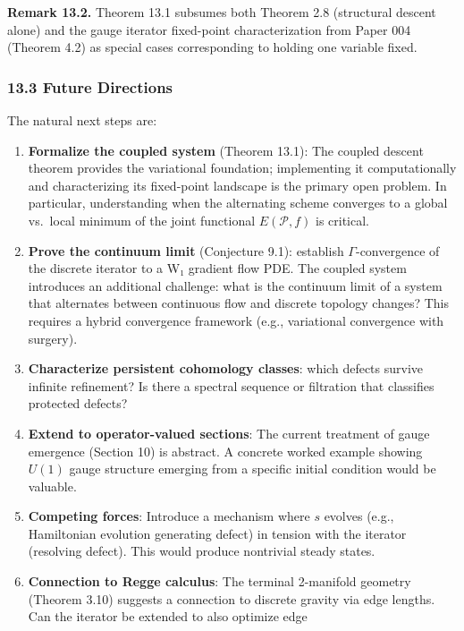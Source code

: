 \documentclass[
]{article}
\begin{document}
\textbf{Remark 13.2.} Theorem 13.1 subsumes both Theorem 2.8 (structural
descent alone) and the gauge iterator fixed-point characterization from
Paper 004 (Theorem 4.2) as special cases corresponding to holding one
variable fixed.

\subsubsection{13.3 Future Directions}\label{future-directions}

The natural next steps are:

\begin{enumerate}
\def\labelenumi{\arabic{enumi}.}
\item
  \textbf{Formalize the coupled system} (Theorem 13.1): The coupled
  descent theorem provides the variational foundation; implementing it
  computationally and characterizing its fixed-point landscape is the
  primary open problem. In particular, understanding when the
  alternating scheme converges to a global vs.~local minimum of the
  joint functional \(E(\mathcal{P}, f)\) is critical.
\item
  \textbf{Prove the continuum limit} (Conjecture 9.1): establish
  \(\Gamma\)-convergence of the discrete iterator to a W₁ gradient flow
  PDE. The coupled system introduces an additional challenge: what is
  the continuum limit of a system that alternates between continuous
  flow and discrete topology changes? This requires a hybrid convergence
  framework (e.g., variational convergence with surgery).
\item
  \textbf{Characterize persistent cohomology classes}: which defects
  survive infinite refinement? Is there a spectral sequence or
  filtration that classifies protected defects?
\item
  \textbf{Extend to operator-valued sections}: The current treatment of
  gauge emergence (Section 10) is abstract. A concrete worked example
  showing \(U(1)\) gauge structure emerging from a specific initial
  condition would be valuable.
\item
  \textbf{Competing forces}: Introduce a mechanism where \(s\) evolves
  (e.g., Hamiltonian evolution generating defect) in tension with the
  iterator (resolving defect). This would produce nontrivial steady
  states.
\item
  \textbf{Connection to Regge calculus}: The terminal 2-manifold
  geometry (Theorem 3.10) suggests a connection to discrete gravity via
  edge lengths. Can the iterator be extended to also optimize edge

\end{enumerate}
\end{document}
